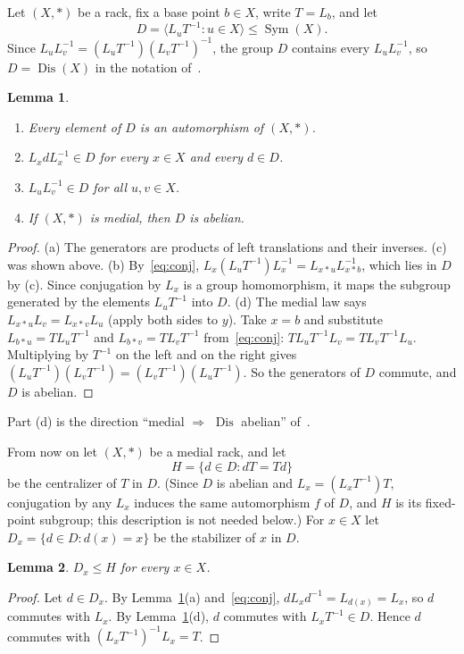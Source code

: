 \documentclass[11pt]{article}
\newtheorem{lemma}{Lemma}
\theoremstyle{definition}
\theoremstyle{remark}
\DeclareMathOperator{\Dis}{Dis}
\DeclareMathOperator{\Sym}{Sym}
\begin{document}
Let $(X,*)$ be a rack, fix a base point $b\in X$, write $T=L_b$, and let
\[
D=\bigl\langle L_uT^{-1} : u\in X\bigr\rangle\le\Sym(X).
\]
Since $L_uL_v^{-1}=(L_uT^{-1})(L_vT^{-1})^{-1}$, the group $D$ contains every
$L_uL_v^{-1}$, so $D=\Dis(X)$ in the notation of~\cite{vy}.

\begin{lemma}\label{lem:dis}
\begin{enumerate}
\item[(a)] Every element of $D$ is an automorphism of $(X,*)$.
\item[(b)] $L_xdL_x^{-1}\in D$ for every $x\in X$ and every $d\in D$.
\item[(c)] $L_uL_v^{-1}\in D$ for all $u,v\in X$.
\item[(d)] If $(X,*)$ is medial, then $D$ is abelian.
\end{enumerate}
\end{lemma}

\begin{proof}
(a) The generators are products of left translations and their inverses.
(c) was shown above. (b) By~\eqref{eq:conj},
$L_x(L_uT^{-1})L_x^{-1}=L_{x*u}L_{x*b}^{-1}$, which lies in $D$ by (c). Since
conjugation by $L_x$ is a group homomorphism, it maps the subgroup generated by
the elements $L_uT^{-1}$ into $D$. (d) The medial law says $L_{x*u}L_v=L_{x*v}L_u$ (apply both sides to $y$).
Take $x=b$ and substitute $L_{b*u}=TL_uT^{-1}$ and $L_{b*v}=TL_vT^{-1}$
from~\eqref{eq:conj}: $TL_uT^{-1}L_v=TL_vT^{-1}L_u$. Multiplying by $T^{-1}$ on
the left and on the right gives
$(L_uT^{-1})(L_vT^{-1})=(L_vT^{-1})(L_uT^{-1})$. So the generators of $D$
commute, and $D$ is abelian.
\end{proof}

Part (d) is the direction ``medial $\Rightarrow$ $\Dis$ abelian''
of~\cite[Proposition~2.4(ii)]{hsv}.

From now on let $(X,*)$ be a medial rack, and let
\[
H=\{d\in D : dT=Td\}
\]
be the centralizer of $T$ in $D$. (Since $D$ is abelian and
$L_x=(L_xT^{-1})T$, conjugation by any $L_x$ induces the same automorphism
$f$ of $D$, and $H$ is its fixed-point subgroup; this description is not
needed below.) For $x\in X$ let $D_x=\{d\in D: d(x)=x\}$ be the stabilizer of
$x$ in $D$.

\begin{lemma}\label{lem:stab}
$D_x\le H$ for every $x\in X$.
\end{lemma}

\begin{proof}
Let $d\in D_x$. By Lemma~\ref{lem:dis}(a) and~\eqref{eq:conj},
$dL_xd^{-1}=L_{d(x)}=L_x$, so $d$ commutes with $L_x$. By
Lemma~\ref{lem:dis}(d), $d$ commutes with $L_xT^{-1}\in D$. Hence $d$ commutes
with $(L_xT^{-1})^{-1}L_x=T$.
\end{proof}
\end{document}
